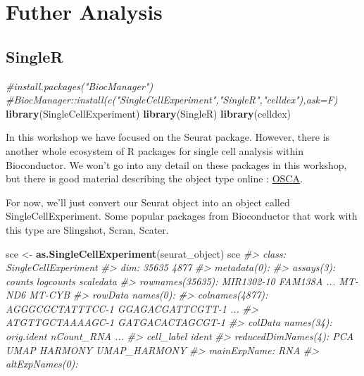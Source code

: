 \documentclass[
]{book}
\newenvironment{Shaded}{\begin{snugshade}}{\end{snugshade}}
\newcommand{\CommentTok}[1]{\textcolor[rgb]{0.56,0.35,0.01}{\textit{#1}}}
\newcommand{\FunctionTok}[1]{\textcolor[rgb]{0.13,0.29,0.53}{\textbf{#1}}}
\newcommand{\NormalTok}[1]{#1}
\newcommand{\OtherTok}[1]{\textcolor[rgb]{0.56,0.35,0.01}{#1}}
\begin{document}
\part{Futher Analysis}\label{part-futher-analysis}

\chapter{SingleR}\label{singler}

\begin{Shaded}
\begin{Highlighting}[]
\CommentTok{\#install.packages("BiocManager")}
\CommentTok{\#BiocManager::install(c("SingleCellExperiment","SingleR","celldex"),ask=F)}
\FunctionTok{library}\NormalTok{(SingleCellExperiment)}
\FunctionTok{library}\NormalTok{(SingleR)}
\FunctionTok{library}\NormalTok{(celldex)}
\end{Highlighting}
\end{Shaded}

In this workshop we have focused on the Seurat package. However, there is another whole ecosystem of R packages for single cell analysis within Bioconductor. We won't go into any detail on these packages in this workshop, but there is good material describing the object type online : \href{https://robertamezquita.github.io/orchestratingSingleCellAnalysis/data-infrastructure.html}{OSCA}.

For now, we'll just convert our Seurat object into an object called SingleCellExperiment. Some popular packages from Bioconductor that work with this type are Slingshot, Scran, Scater.

\begin{Shaded}
\begin{Highlighting}[]
\NormalTok{sce }\OtherTok{\textless{}{-}} \FunctionTok{as.SingleCellExperiment}\NormalTok{(seurat\_object)}
\NormalTok{sce}
\CommentTok{\#\textgreater{} class: SingleCellExperiment }
\CommentTok{\#\textgreater{} dim: 35635 4877 }
\CommentTok{\#\textgreater{} metadata(0):}
\CommentTok{\#\textgreater{} assays(3): counts logcounts scaledata}
\CommentTok{\#\textgreater{} rownames(35635): MIR1302{-}10 FAM138A ... MT{-}ND6 MT{-}CYB}
\CommentTok{\#\textgreater{} rowData names(0):}
\CommentTok{\#\textgreater{} colnames(4877): AGGGCGCTATTTCC{-}1 GGAGACGATTCGTT{-}1 ...}
\CommentTok{\#\textgreater{}   ATGTTGCTAAAAGC{-}1 GATGACACTAGCGT{-}1}
\CommentTok{\#\textgreater{} colData names(34): orig.ident nCount\_RNA ...}
\CommentTok{\#\textgreater{}   cell\_label ident}
\CommentTok{\#\textgreater{} reducedDimNames(4): PCA UMAP HARMONY UMAP\_HARMONY}
\CommentTok{\#\textgreater{} mainExpName: RNA}
\CommentTok{\#\textgreater{} altExpNames(0):}
\end{Highlighting}
\end{Shaded}
\end{document}
